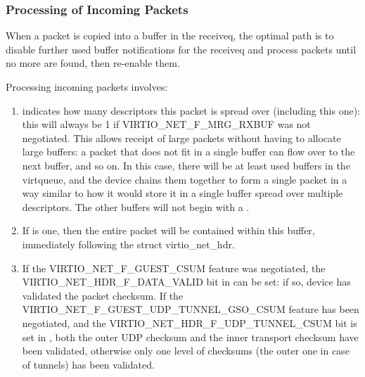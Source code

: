 \subsubsection{Processing of Incoming Packets}\label{sec:Device Types / Network Device / Device Operation / Processing of Incoming Packets}
\label{sec:Device Types / Network Device / Device Operation / Processing of Packets}%

When a packet is copied into a buffer in the receiveq, the
optimal path is to disable further used buffer notifications for the
receiveq and process packets until no more are found, then re-enable
them.

Processing incoming packets involves:

\begin{enumerate}
\item {} indicates how many descriptors
  this packet is spread over (including this one): this will
  always be 1 if VIRTIO_NET_F_MRG_RXBUF was not negotiated.
  This allows receipt of large packets without having to allocate large
  buffers: a packet that does not fit in a single buffer can flow
  over to the next buffer, and so on. In this case, there will be
  at least  used buffers in the virtqueue, and the device
  chains them together to form a single packet in a way similar to
  how it would store it in a single buffer spread over multiple
  descriptors.
  The other buffers will not begin with a .

\item If
   is one, then the entire packet will be
  contained within this buffer, immediately following the struct
  virtio_net_hdr.
\item If the VIRTIO_NET_F_GUEST_CSUM feature was negotiated, the
  VIRTIO_NET_HDR_F_DATA_VALID bit in  can be
  set: if so, device has validated the packet checksum.
  If the VIRTIO_NET_F_GUEST_UDP_TUNNEL_GSO_CSUM feature has been negotiated,
  and the VIRTIO_NET_HDR_F_UDP_TUNNEL_CSUM bit is set in ,
  both the outer UDP checksum and the inner transport checksum
  have been validated, otherwise only one level of checksums (the outer one
  in case of tunnels) has been validated.
\end{enumerate}

